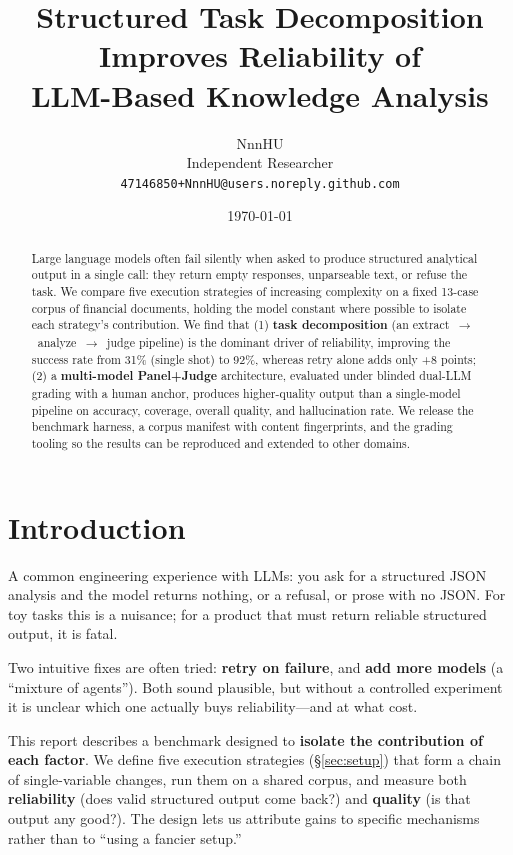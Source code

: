 \documentclass[11pt]{article}
\title{Structured Task Decomposition Improves Reliability of \\
       LLM-Based Knowledge Analysis}
\author{NnnHU\\
        Independent Researcher\\
        \texttt{47146850+NnnHU@users.noreply.github.com}}
\date{\today}
\begin{document}
\maketitle

\begin{abstract}
Large language models often fail silently when asked to produce structured
analytical output in a single call: they return empty responses, unparseable
text, or refuse the task. We compare five execution strategies of increasing
complexity on a fixed 13-case corpus of financial documents, holding the model
constant where possible to isolate each strategy's contribution. We find that
(1) \textbf{task decomposition} (an extract~$\rightarrow$~analyze~$\rightarrow$~judge
pipeline) is the dominant driver of reliability, improving the success rate from
31\% (single shot) to 92\%, whereas retry alone adds only +8 points; (2) a
\textbf{multi-model Panel+Judge} architecture, evaluated under blinded dual-LLM
grading with a human anchor, produces higher-quality output than a single-model
pipeline on accuracy, coverage, overall quality, and hallucination rate. We
release the benchmark harness, a corpus manifest with content fingerprints, and
the grading tooling so the results can be reproduced and extended to other
domains.
\end{abstract}

\section{Introduction}

A common engineering experience with LLMs: you ask for a structured JSON
analysis and the model returns nothing, or a refusal, or prose with no JSON.
For toy tasks this is a nuisance; for a product that must return reliable
structured output, it is fatal.

Two intuitive fixes are often tried: \textbf{retry on failure}, and
\textbf{add more models} (a ``mixture of agents''). Both sound plausible, but
without a controlled experiment it is unclear which one actually buys
reliability---and at what cost.

This report describes a benchmark designed to \textbf{isolate the contribution
of each factor}. We define five execution strategies (\S\ref{sec:setup}) that
form a chain of single-variable changes, run them on a shared corpus, and
measure both \textbf{reliability} (does valid structured output come back?) and
\textbf{quality} (is that output any good?). The design lets us attribute gains
to specific mechanisms rather than to ``using a fancier setup.''
\end{document}
